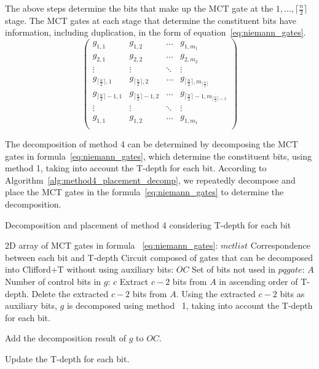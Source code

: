 The above steps determine the bits that make up the MCT gate at the $1,\dots ,\lceil \frac{n}{2} \rceil$ stage.
The MCT gates at each stage that determine the constituent bits have information, including duplication, in the form of equation~\ref{eq:niemann_gates}.
\begin{equation}\label{eq:niemann_gates}
 \begin{pmatrix}
 g_{1,1} & g_{1,2} & \dots & g_{1,m_{1}} \\
 g_{2,1} & g_{2,2} & \dots & g_{2,m_{2}} \\
 \vdots & \vdots & \ddots & \vdots \\
 g_{\lceil \frac{n}{2} \rceil,1} & g_{\lceil \frac{n}{2} \rceil,2} & \dots & g_{\lceil \frac{n}{2} \rceil,m_{\lceil \frac{n}{2} \rceil}}\\
 g_{\lceil \frac{n}{2} \rceil -1, 1} & g_{\lceil \frac{n}{2} \rceil-1 ,2}& \dots & g_{\lceil \frac{n}{2} \rceil-1 ,m_{\lceil \frac{n}{2} \rceil-1}}\\
\vdots & \vdots & \ddots &\vdots \\
g_{1,1} & g_{1,2} & \dots & g_{1,m_{1}} \\
\end{pmatrix}
\end{equation}
\par
The decomposition of method 4 can be determined by decomposing the MCT gates in
formula~\ref{eq:niemann_gates},
which determine the constituent bits, using method 1,
taking into account the T-depth for each bit.
According to Algorithm~\ref{alg:method4_placement_decomp},
we repeatedly decompose and place the MCT gates in
the formula~\ref{eq:niemann_gates} to determine the decomposition.
\begin{algorithm}[tbp]
\caption{Decomposition and placement of method 4 considering T-depth for each bit}
\label{alg:method4_placement_decomp}
\begin{algorithmic}[1]
\Require 2D array of MCT gates in formula ~\ref{eq:niemann_gates}: $mctlist$
\Require Correspondence between each bit and T-depth
\Ensure Circuit composed of gates that can be decomposed into Clifford+T without using auxiliary bits: $OC$
\State Set of bits not used in $pqgate$: $A$
\State Number of control bits in $g$: $c$
\State Extract $c-2$ bits from \State $A$ in ascending order of T-depth.
\State Delete the extracted $c-2$ bits from \State $A$.
\State Using the extracted $c-2$ bits as auxiliary bits, $g$ is decomposed using method ~1, taking into account the T-depth for each bit.

\State Add the decomposition result of $g$ to $OC$.

\EndFor

\State Update the T-depth for each bit.

\EndFor

\end{algorithmic}
\end{algorithm}
